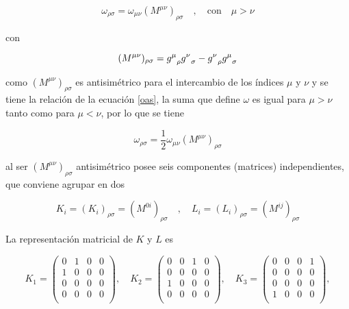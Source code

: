 $$ \omega_{\rho\sigma} = \omega_{\mu\nu}(M^{\mu\nu})_{\rho\sigma} \quad,\quad \text{con}\quad \mu>\nu $$

con

$$ (M^{\mu\nu})_{\rho\sigma} = g_{\hspace{0.2cm}\rho}^{\mu}g_{\hspace{0.2cm}\sigma}^{\nu} - g_{\hspace{0.2cm}\rho}^{\nu}g_{\hspace{0.2cm}\sigma}^{\mu} $$

como $(M^{\mu\nu})_{\rho\sigma}$ es antisimétrico para el intercambio de los índices $\mu$ y $\nu$ y se tiene la relación de la ecuación \ref{oas}, la suma que define $\omega$ es igual para $\mu>\nu$ tanto como para $\mu<\nu$, por lo que se tiene

$$ \omega_{\rho\sigma} = \frac{1}{2}\omega_{\mu\nu}(M^{\mu\nu})_{\rho\sigma} $$

al ser $(M^{\mu\nu})_{\rho\sigma}$ antisimétrico posee seis componentes (matrices) independientes, que conviene agrupar en dos

$$ K_i = (K_i)_{\rho\sigma} = (M^{0i})_{\rho\sigma} \quad , \quad L_i = (L_i)_{\rho\sigma} = (M^{ij})_{\rho\sigma} $$

La representación matricial de $K$ y $L$ es

\[
K_1 = \begin{pmatrix}
0 & 1 & 0 & 0 \\
1 & 0 & 0 & 0 \\
0 & 0 & 0 & 0 \\
0 & 0 & 0 & 0 \\
\end{pmatrix}, \quad
K_2 = \begin{pmatrix}
0 & 0 & 1 & 0 \\
0 & 0 & 0 & 0 \\
1 & 0 & 0 & 0 \\
0 & 0 & 0 & 0 \\
\end{pmatrix}, \quad
K_3 = \begin{pmatrix}
0 & 0 & 0 & 1 \\
0 & 0 & 0 & 0 \\
0 & 0 & 0 & 0 \\
1 & 0 & 0 & 0 \\
\end{pmatrix},
\]


